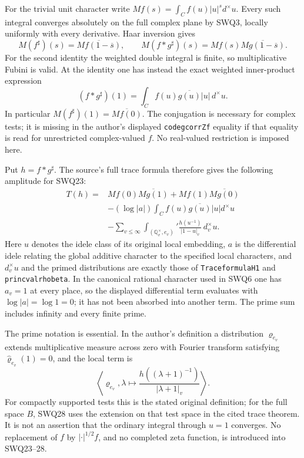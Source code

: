 For the trivial unit character write
$M f(s)=\int_C f(u)|u|^s d^{\times}u$. Every such integral
converges absolutely on the full complex plane by SWQ3, locally
uniformly with every derivative. Haar inversion gives
\begin{equation}\tag{SWQ26}
 M(f^{\sharp})(s)=\overline{M f(1-\overline s)},\qquad
 M(f*g^{\sharp})(s)=M f(s)\overline{M g(1-\overline s)}.
\end{equation}
For the second identity the weighted double integral is finite,
so multiplicative Fubini is valid. At the identity one has instead
the exact weighted inner-product expression
\begin{equation}\tag{SWQ27}
 (f*g^{\sharp})(1)
    =\int_C f(u)\overline{g(u)}|u|\,d^{\times}u.
\end{equation}
In particular $M(f^{\sharp})(1)=\overline{M f(0)}$.
The conjugation is necessary for complex tests; it is missing in
the author's displayed \texttt{codegcorrZf} equality if that equality
is read for unrestricted complex-valued $f$. No real-valued
restriction is imposed here.

Put $h=f*g^{\sharp}$. The source's full trace formula therefore
gives the following amplitude for SWQ23:
\begin{equation}\tag{SWQ28}
\begin{split}
 T(h)={}&M f(0)\overline{M g(1)}
       +M f(1)\overline{M g(0)}\\
 &-(\log|a|)\int_C f(u)\overline{g(u)}|u|d^{\times}u\\
 &-\sum_{v\le\infty}\int_{(\mathbb Q_v^{\times},e_v)}'
                \frac{h(u^{-1})}{|1-u|_v}\,d_v^{\times}u.
\end{split}
\end{equation}
Here $u$ denotes the idele class of its original local embedding,
$a$ is the differential idele relating the global additive character
to the specified local characters, and $d_v^{\times}u$ and the
primed distributions are exactly those of
\texttt{TraceformulaH1} and \texttt{princvalrhobeta}.
In the canonical rational character used in SWQ6 one has $a_v=1$
at every place, so the displayed differential term evaluates with
$\log|a|=\log1=0$; it has not been absorbed into another term.
The prime sum includes infinity and every finite prime.

The prime notation is essential. In the author's definition a
distribution $\varrho_{e_v}$ extends multiplicative measure across
zero with Fourier transform satisfying
$\widehat\varrho_{e_v}(1)=0$, and the local term is
\[
 \left\langle\varrho_{e_v},
   \lambda\longmapsto
       \frac{h((\lambda+1)^{-1})}{|\lambda+1|_v}\right\rangle.
\]
For compactly supported tests this is the stated original definition;
for the full space $B$, SWQ28 uses the extension on that test space
in the cited trace theorem. It is not an assertion that the ordinary
integral through $u=1$ converges. No replacement of $f$ by
$|\cdot|^{1/2}f$, and no completed zeta function, is introduced
into SWQ23--28.

